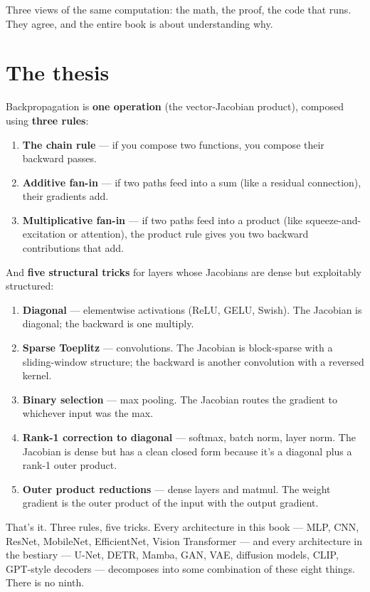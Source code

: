 Three views of the same computation: the math, the proof, the code
that runs. They agree, and the entire book is about understanding why.

\section*{The thesis}

Backpropagation is \textbf{one operation} (the vector-Jacobian product),
composed using \textbf{three rules}:

\begin{enumerate}
  \item \textbf{The chain rule} --- if you compose two functions, you compose
    their backward passes.
  \item \textbf{Additive fan-in} --- if two paths feed into a sum (like a
    residual connection), their gradients add.
  \item \textbf{Multiplicative fan-in} --- if two paths feed into a product
    (like squeeze-and-excitation or attention), the product rule
    gives you two backward contributions that add.
\end{enumerate}

And \textbf{five structural tricks} for layers whose Jacobians are dense
but exploitably structured:

\begin{enumerate}
  \item \textbf{Diagonal} --- elementwise activations (ReLU, GELU, Swish).
    The Jacobian is diagonal; the backward is one multiply.
  \item \textbf{Sparse Toeplitz} --- convolutions. The Jacobian is block-sparse
    with a sliding-window structure; the backward is another
    convolution with a reversed kernel.
  \item \textbf{Binary selection} --- max pooling. The Jacobian routes the
    gradient to whichever input was the max.
  \item \textbf{Rank-1 correction to diagonal} --- softmax, batch norm, layer
    norm. The Jacobian is dense but has a clean closed form because
    it's a diagonal plus a rank-1 outer product.
  \item \textbf{Outer product reductions} --- dense layers and matmul. The
    weight gradient is the outer product of the input with the
    output gradient.
\end{enumerate}

That's it. Three rules, five tricks. Every architecture in this book ---
MLP, CNN, ResNet, MobileNet, EfficientNet, Vision Transformer --- and
every architecture in the bestiary --- U-Net, DETR, Mamba, GAN, VAE,
diffusion models, CLIP, GPT-style decoders --- decomposes into some
combination of these eight things. There is no ninth.

